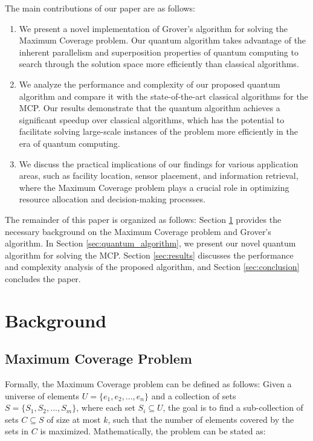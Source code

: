 The main contributions of our paper are as follows:

\begin{enumerate}
    \item We present a novel implementation of Grover's algorithm for solving the Maximum Coverage problem. Our quantum algorithm takes advantage of the inherent parallelism and superposition properties of quantum computing to search through the solution space more efficiently than classical algorithms.
    
    \item We analyze the performance and complexity of our proposed quantum algorithm and compare it with the state-of-the-art classical algorithms for the MCP. Our results demonstrate that the quantum algorithm achieves a significant speedup over classical algorithms, which has the potential to facilitate solving large-scale instances of the problem more efficiently in the era of quantum computing.
    
    \item We discuss the practical implications of our findings for various application areas, such as facility location, sensor placement, and information retrieval, where the Maximum Coverage problem plays a crucial role in optimizing resource allocation and decision-making processes.
\end{enumerate}

The remainder of this paper is organized as follows: Section \ref{sec:background} provides the necessary background on the Maximum Coverage problem and Grover's algorithm. In Section \ref{sec:quantum_algorithm}, we present our novel quantum algorithm for solving the MCP. Section \ref{sec:results} discusses the performance and complexity analysis of the proposed algorithm, and Section \ref{sec:conclusion} concludes the paper.

\section{Background}\label{sec:background}

\subsection{Maximum Coverage Problem}

Formally, the Maximum Coverage problem can be defined as follows: Given a universe of elements $U = \{e_1, e_2, ..., e_n\}$ and a collection of sets $S = \{S_1, S_2, ..., S_m\}$, where each set $S_i \subseteq U$, the goal is to find a sub-collection of sets $C \subseteq S$ of size at most $k$, such that the number of elements covered by the sets in $C$ is maximized. Mathematically, the problem can be stated as:

